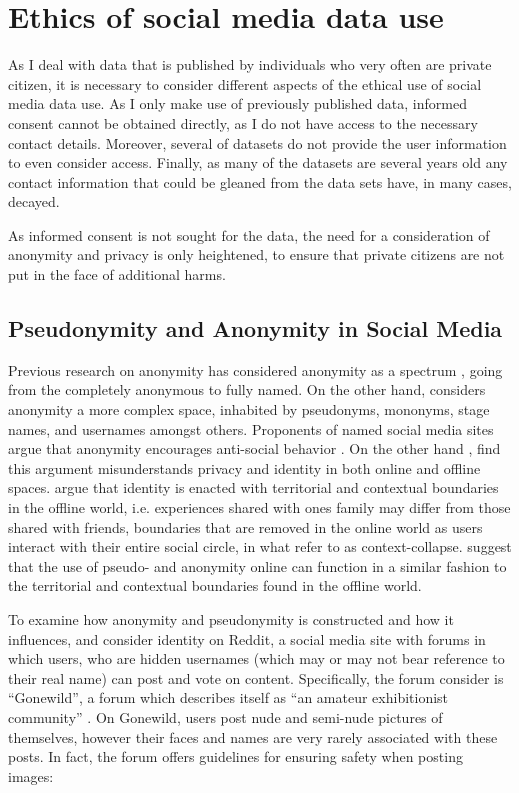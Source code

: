 \section{Ethics of social media data use}

As I deal with data that is published by individuals who very often are private citizen, it is necessary to consider different aspects of the ethical use of social media data use. As I only make use of previously published data, informed consent cannot be obtained directly, as I do not have access to the necessary contact details. Moreover, several of datasets do not provide the user information to even consider access. Finally, as many of the datasets are several years old any contact information that could be gleaned from the data sets have, in many cases, decayed.

As informed consent is not sought for the data, the need for a consideration of anonymity and privacy is only heightened, to ensure that private citizens are not put in the face of additional harms.

\subsection{Pseudonymity and Anonymity in Social Media}\label{sec:pseudonymity}

Previous research on anonymity has considered anonymity as a spectrum \citep{Qian:2007,Donath:1999}, going from the completely anonymous to fully named. On the other hand, \cite{Nagel:2015} considers anonymity a more complex space, inhabited by pseudonyms, mononyms, stage names, and usernames amongst others. Proponents of named social media sites argue that anonymity encourages anti-social behavior \citep{Galperin:2011}. On the other hand \cite{Nagel:2015}, find this argument misunderstands privacy and identity in both online and offline spaces. \cite{Nagel:2015} argue that identity is enacted with territorial and contextual boundaries in the offline world, i.e. experiences shared with ones family may differ from those shared with friends, boundaries that are removed in the online world as users interact with their entire social circle, in what \cite{Marwick:2011} refer to as context-collapse. \cite{Nagel:2015} suggest that the use of pseudo- and anonymity online can function in a similar fashion to the territorial and contextual boundaries found in the offline world.

To examine how anonymity and pseudonymity is constructed and how it influences, \cite{Nagel:2015} and \cite{Nagel:2013} consider identity on Reddit, a social media site with forums in which users, who are hidden usernames (which may or may not bear reference to their real name) can post and vote on content. Specifically, the forum \cite{Nagel:2013,Nagel:2015} consider is ``Gonewild'', a forum which describes itself as ``an amateur exhibitionist community'' \citep{Nagel:2015}. On Gonewild, users post nude and semi-nude pictures of themselves, however their faces and names are very rarely associated with these posts. In fact, the forum offers guidelines for ensuring safety when posting images:

